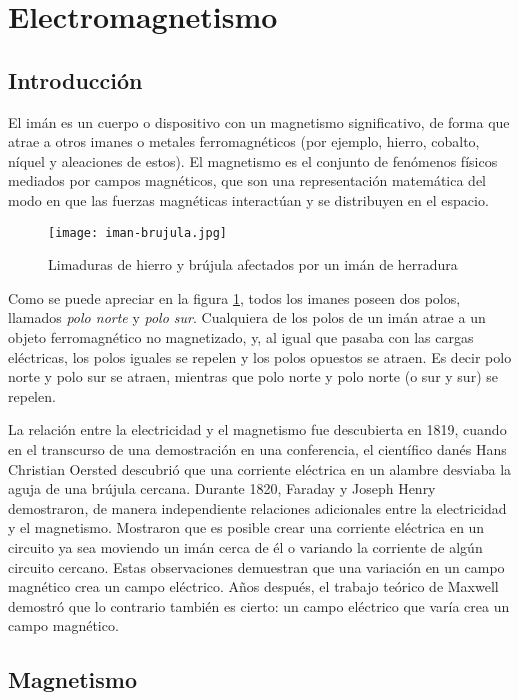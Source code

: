 \section{Electromagnetismo}

\subsection{Introducción}

El imán es un cuerpo o dispositivo con un magnetismo significativo, de forma que atrae a otros imanes o metales ferromagnéticos (por ejemplo, hierro, cobalto, níquel y aleaciones de estos). El magnetismo es el conjunto de fenómenos físicos mediados por campos magnéticos, que son una representación matemática del modo en que las fuerzas magnéticas interactúan y se distribuyen en el espacio.

\begin{figure}[ht]
  \centering
  \texttt{[image: iman-brujula.jpg]}
  \caption{Limaduras de hierro y brújula afectados por un imán de herradura}
  \label{fig:iman}
\end{figure}

Como se puede apreciar en la figura \ref{fig:iman}, todos los imanes poseen dos polos, llamados \textit{polo norte} y \textit{polo sur}. Cualquiera de los polos de un imán atrae a un objeto ferromagnético no magnetizado, y, al igual que pasaba con las cargas eléctricas, los polos iguales se repelen y los polos opuestos se atraen. Es decir polo norte y polo sur se atraen, mientras que polo norte y polo norte (o sur y sur) se repelen.

La relación entre la electricidad y el magnetismo fue descubierta en 1819, cuando en el transcurso de una demostración en una conferencia, el científico danés Hans Christian Oersted descubrió que una corriente eléctrica en un alambre desviaba la aguja de una brújula cercana. Durante 1820, Faraday y Joseph Henry demostraron, de manera independiente relaciones adicionales entre la electricidad y el magnetismo. Mostraron que es posible crear una corriente eléctrica en un circuito ya sea moviendo un imán cerca de él o variando la corriente de algún circuito cercano. Estas observaciones demuestran que una variación en un campo magnético crea un campo eléctrico. Años después, el trabajo teórico de Maxwell demostró que lo contrario también es cierto: un campo eléctrico que varía crea un campo magnético.

\subsection{Magnetismo}

